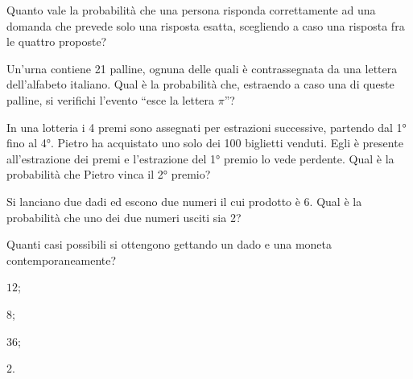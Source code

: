 \begin{esercizio}[2007~\Ast]
\label{ese:9.79}
Quanto vale la probabilità che una persona risponda correttamente ad una domanda che prevede solo una risposta esatta, scegliendo a caso una risposta fra le quattro proposte?
\end{esercizio}

\begin{esercizio}[2007~\Ast]
\label{ese:9.80}
Un'urna contiene 21 palline, ognuna delle quali è contrassegnata da una lettera dell'alfabeto italiano. Qual è la probabilità che, estraendo a caso una di queste palline, si verifichi l'evento ``esce la lettera $\pi $''?
\end{esercizio}

\begin{esercizio}[2007~\Ast]
\label{ese:9.81}
In una lotteria i 4 premi sono assegnati per estrazioni successive, partendo dal 1° fino al 4°. Pietro ha acquistato uno solo dei 100 biglietti venduti. Egli è presente all'estrazione dei premi e l'estrazione del 1° premio lo vede perdente. Qual è la probabilità che Pietro vinca il 2° premio?
\end{esercizio}

\begin{esercizio}[2007~\Ast]
\label{ese:9.82}
Si lanciano due dadi ed escono due numeri il cui prodotto è 6. Qual è la probabilità che uno dei due numeri usciti sia 2?
\end{esercizio}

\begin{esercizio} [2007~\Ast]
\label{ese:9.83}
Quanti casi possibili si ottengono gettando un dado e una moneta contemporaneamente?
\begin{multicols}{2}
\begin{enumeratea}
\item $12$;
\item $8$;
\item $36$;
\item $2$.
\end{enumeratea}
\end{multicols}
\end{esercizio}

